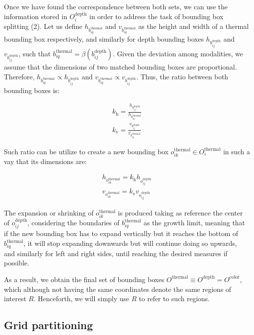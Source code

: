 \documentclass[10pt,twocolumn,letterpaper]{article}
\begin{document}
 Once we have found the correspondence between both sets, we can use the information stored in $O^\mathrm{depth}_i$ in order to address the task of bounding box splitting (2). Let us define $h_{b^\mathrm{thermal}_{iq}}$ and $v_{b^\mathrm{thermal}_{iq}}$ as the height and width of a thermal bounding box respectively, and similarly for depth bounding boxes $h_{b^\mathrm{depth}_{ij}}$ and $v_{b^\mathrm{depth}_{ij}}$, such that $b^\mathrm{thermal}_{iq} =  \beta(b^\mathrm{depth}_{ij})$. Given the deviation among modalities, we assume that the dimensions of two matched bounding boxes are proportional.  Therefore, $h_{b^\mathrm{thermal}_{iq}} \propto h_{b^\mathrm{depth}_{ij}}$ and  $v_{b^\mathrm{thermal}_{iq}} \propto v_{b^\mathrm{depth}_{ij}}$. Thus, the ratio between both bounding boxes is:

\begin{gather}
k_\text{h} = \frac{h_{b^\mathrm{depth}_{ij}}}{h_{b^\mathrm{thermal}_{iq}}}\\[2ex]
k_\text{v} = \frac{v_{b^\mathrm{depth}_{ij}}}{v_{b^\mathrm{thermal}_{iq}}}
\end{gather}

Such ratio can be utilize to create a new bounding box $o^\mathrm{thermal}_{ik} \in O^\mathrm{thermal}_i $ in such a vay that its dimensions are:

\begin{gather}
h_{o^\mathrm{thermal}_{ik}} =  k_\text{h} h_{o^\mathrm{depth}_{ij}}  \\[2ex]
v_{o^\mathrm{thermal}_{ik}} =  k_\text{v} v_{o^\mathrm{depth}_{ij}} 
\end{gather}

The expansion or shrinking of $o^\mathrm{thermal}_{ik}$ is produced taking as reference the center of $o^\mathrm{depth}_{ij}$, considering the boundaries of $b^\mathrm{thermal}_{iq}$ as the growth limit, meaning that if the new bounding box has to expand vertically but it reaches the bottom of $b^\mathrm{thermal}_{iq}$, it will stop expanding downwards but will continue doing so upwards, and similarly for left and right sides, until reaching the desired measures if possible. 

As a result, we obtain the final set of bounding boxes $O^\mathrm{thermal} \equiv O^\mathrm{depth} = O^\mathrm{color}$, which although not having the same coordinates denote the same regions of interest $R$. Henceforth, we will simply use $R$ to refer to such regions.

\subsection{Grid partitioning}
\label{ssec:gridpartitioning}
\end{document}
